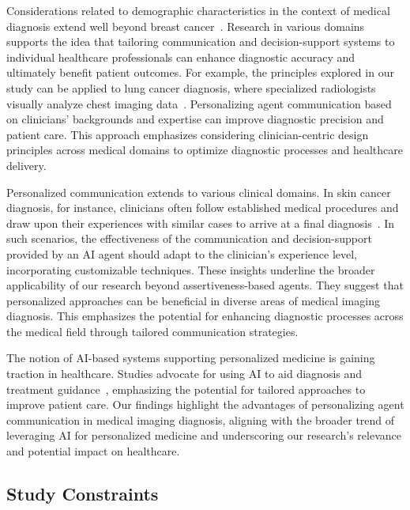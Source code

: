 \textcolor{revised}{Considerations related to demographic characteristics in the context of medical diagnosis extend well beyond breast cancer~\cite{STAHNKE2021103243, LANDRO2020102897, doi:10.1080/21642850.2020.1741372}.
Research in various domains supports the idea that tailoring communication and decision-support systems to individual healthcare professionals can enhance diagnostic accuracy and ultimately benefit patient outcomes.
For example, the principles explored in our study can be applied to lung cancer diagnosis, where specialized radiologists visually analyze chest imaging data~\cite{10.1145/3313831.3376807}.
Personalizing agent communication based on clinicians' backgrounds and expertise can improve diagnostic precision and patient care.
This approach emphasizes considering clinician-centric design principles across medical domains to optimize diagnostic processes and healthcare delivery.}

\textcolor{revised}{Personalized communication extends to various clinical domains.
In skin cancer diagnosis, for instance, clinicians often follow established medical procedures and draw upon their experiences with similar cases to arrive at a final diagnosis~\cite{10.1007/978-3-030-87199-4_52, Tschandl2020, Esteva2017}.
In such scenarios, the effectiveness of the communication and decision-support provided by an \ac{AI} agent should adapt to the clinician's experience level, incorporating customizable techniques.
These insights underline the broader applicability of our research beyond assertiveness-based agents.
They suggest that personalized approaches can be beneficial in diverse areas of medical imaging diagnosis.
This emphasizes the potential for enhancing diagnostic processes across the medical field through tailored communication strategies.}

\textcolor{revised}{The notion of \acs{AI}-based systems supporting personalized medicine is gaining traction in healthcare.
Studies advocate for using \ac{AI} to aid diagnosis and treatment guidance~\cite{Sollini2020, Aerts2016}, emphasizing the potential for tailored approaches to improve patient care.
Our findings highlight the advantages of personalizing agent communication in medical imaging diagnosis, aligning with the broader trend of leveraging \ac{AI} for personalized medicine and underscoring our research's relevance and potential impact on healthcare.}

\subsection{Study Constraints}
\label{sec:app005008002}

